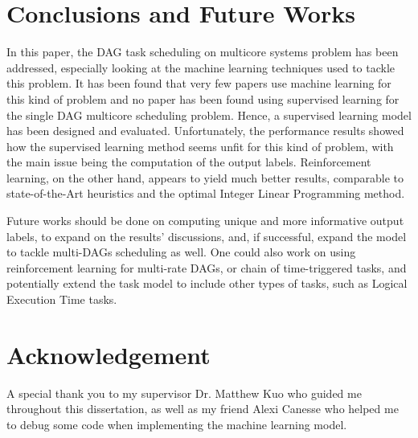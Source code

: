 \documentclass[conference]{IEEEtran}
\begin{document}









\section{Conclusions and Future Works}


In this paper, the DAG task scheduling on multicore systems problem
has been addressed, especially looking at the machine learning
techniques used to tackle this problem.
It has been found that very few papers use machine learning
for this kind of problem and no paper has been found using 
supervised learning for the single DAG multicore scheduling problem.
Hence, a supervised learning model has been designed and evaluated.
Unfortunately, the performance results 
showed how the supervised learning method seems unfit for this kind of 
problem, with the main issue being the computation of the output labels.
Reinforcement learning, on the other hand, appears to yield much better results, comparable
to state-of-the-Art heuristics and the optimal Integer Linear Programming method.

Future works should be done on computing unique and more informative output labels,
to expand on the results' discussions,
and, if successful, expand the model to tackle multi-DAGs scheduling as well. 
One could also work on using reinforcement learning for 
multi-rate DAGs, or chain of time-triggered tasks, and potentially
extend the task model to include other types of tasks,
such as Logical Execution Time tasks.










\section*{Acknowledgement}

A special thank you to my supervisor Dr. Matthew Kuo
who guided me throughout this dissertation,
as well as my friend Alexi Canesse who helped 
me to debug some code when implementing the machine learning model.




\end{document}
